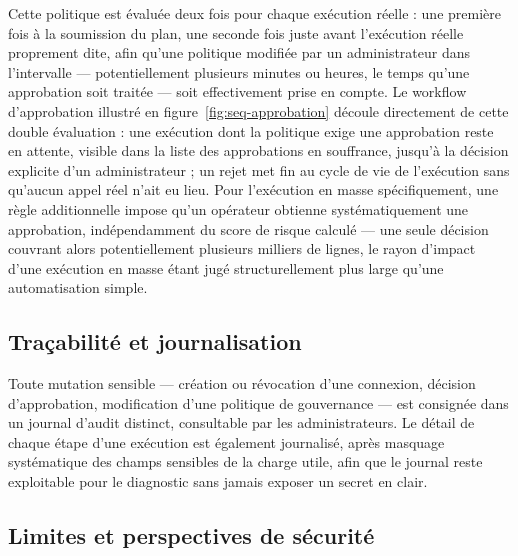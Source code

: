 Cette politique est évaluée deux fois pour chaque exécution réelle : une première fois à la soumission du plan, une seconde fois juste avant l'exécution réelle proprement dite, afin qu'une politique modifiée par un administrateur dans l'intervalle — potentiellement plusieurs minutes ou heures, le temps qu'une approbation soit traitée — soit effectivement prise en compte. Le workflow d'approbation illustré en figure~\ref{fig:seq-approbation} découle directement de cette double évaluation : une exécution dont la politique exige une approbation reste en attente, visible dans la liste des approbations en souffrance, jusqu'à la décision explicite d'un administrateur ; un rejet met fin au cycle de vie de l'exécution sans qu'aucun appel réel n'ait eu lieu. Pour l'exécution en masse spécifiquement, une règle additionnelle impose qu'un opérateur obtienne systématiquement une approbation, indépendamment du score de risque calculé — une seule décision couvrant alors potentiellement plusieurs milliers de lignes, le rayon d'impact d'une exécution en masse étant jugé structurellement plus large qu'une automatisation simple.

\subsection{Traçabilité et journalisation}

Toute mutation sensible — création ou révocation d'une connexion, décision d'approbation, modification d'une politique de gouvernance — est consignée dans un journal d'audit distinct, consultable par les administrateurs. Le détail de chaque étape d'une exécution est également journalisé, après masquage systématique des champs sensibles de la charge utile, afin que le journal reste exploitable pour le diagnostic sans jamais exposer un secret en clair.

\subsection{Limites et perspectives de sécurité}

